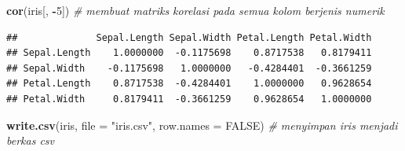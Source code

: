 \documentclass[]{article}
\newenvironment{Shaded}{\begin{snugshade}}{\end{snugshade}}
\newcommand{\KeywordTok}[1]{\textcolor[rgb]{0.13,0.29,0.53}{\textbf{#1}}}
\newcommand{\DataTypeTok}[1]{\textcolor[rgb]{0.13,0.29,0.53}{#1}}
\newcommand{\DecValTok}[1]{\textcolor[rgb]{0.00,0.00,0.81}{#1}}
\newcommand{\StringTok}[1]{\textcolor[rgb]{0.31,0.60,0.02}{#1}}
\newcommand{\CommentTok}[1]{\textcolor[rgb]{0.56,0.35,0.01}{\textit{#1}}}
\newcommand{\OtherTok}[1]{\textcolor[rgb]{0.56,0.35,0.01}{#1}}
\newcommand{\OperatorTok}[1]{\textcolor[rgb]{0.81,0.36,0.00}{\textbf{#1}}}
\newcommand{\NormalTok}[1]{#1}
\begin{document}
\begin{Shaded}
\begin{Highlighting}[]
\KeywordTok{cor}\NormalTok{(iris[, }\OperatorTok{-}\DecValTok{5}\NormalTok{]) }\CommentTok{# membuat matriks korelasi pada semua kolom berjenis numerik}
\end{Highlighting}
\end{Shaded}

\begin{verbatim}
##              Sepal.Length Sepal.Width Petal.Length Petal.Width
## Sepal.Length    1.0000000  -0.1175698    0.8717538   0.8179411
## Sepal.Width    -0.1175698   1.0000000   -0.4284401  -0.3661259
## Petal.Length    0.8717538  -0.4284401    1.0000000   0.9628654
## Petal.Width     0.8179411  -0.3661259    0.9628654   1.0000000
\end{verbatim}

\begin{Shaded}
\begin{Highlighting}[]
\KeywordTok{write.csv}\NormalTok{(iris, }\DataTypeTok{file =} \StringTok{"iris.csv"}\NormalTok{, }\DataTypeTok{row.names =} \OtherTok{FALSE}\NormalTok{) }\CommentTok{# menyimpan iris menjadi berkas csv }
\end{Highlighting}
\end{Shaded}
\end{document}
